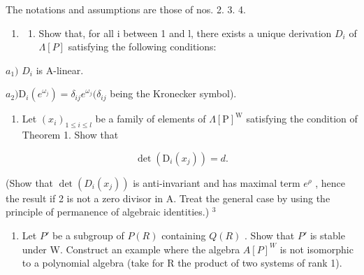 
The notations and assumptions are those of nos. 2. 3. 4.

\begin{enumerate}
\def\labelenumi{\arabic{enumi})}
\tightlist
\item
  \begin{enumerate}
  \def\labelenumii{\alph{enumii})}
  \tightlist
  \item
    Show that, for all i between 1 and l, there exists a unique derivation \(D_{i}\) of \(\Lambda[P]\) satisfying the following conditions:
  \end{enumerate}
\end{enumerate}

\(a_{1})\) \(D_{i}\) is A-linear.

\(a_{2})\mathrm{D}_{i}(e^{\omega_{j}}) = \delta_{ij}e^{\omega_{j}}(\delta_{ij}\) being the Kronecker symbol).

\begin{enumerate}
\def\labelenumi{\alph{enumi})}
\setcounter{enumi}{1}
\tightlist
\item
  Let \((x_{i})_{1\leqslant i\leqslant l}\) be a family of elements of \(\Lambda [\mathrm{P}]^{\mathrm{W}}\) satisfying the condition of Theorem 1. Show that
\end{enumerate}

\[
\det \left(\mathrm{D} _ {i} (x _ {j})\right) = d.
\]

(Show that \(\det(D_{i}(x_{j}))\) is anti-invariant and has maximal term \(e^{\rho}\) , hence the result if 2 is not a zero divisor in A. Treat the general case by using the principle of permanence of algebraic identities.) \(^{3}\)

\begin{enumerate}
\def\labelenumi{\arabic{enumi})}
\setcounter{enumi}{1}
\tightlist
\item
  Let \(P'\) be a subgroup of \(P(R)\) containing \(Q(R)\) . Show that \(P'\) is stable under W. Construct an example where the algebra \(A[P]^{W}\) is not isomorphic to a polynomial algebra (take for R the product of two systems of rank 1).
\end{enumerate}

